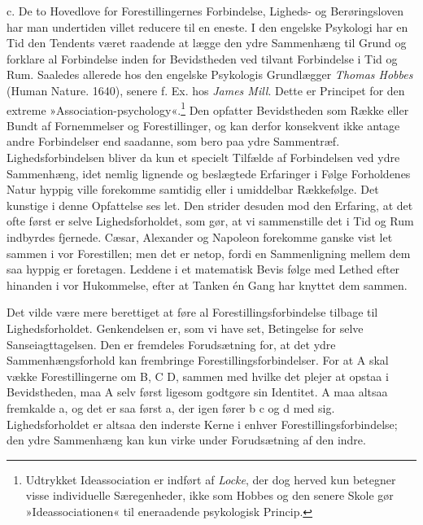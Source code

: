 \documentclass[12pt,a4paper,openany]{book}
\newcommand{\opage}[1]{\marginnote{\footnotesize\textit{[#1]}}}
\begin{document}
c. De to Hovedlove for Forestillingernes Forbindelse, Ligheds- og
Berøringsloven har man undertiden villet reducere til en eneste. I den
engelske Psykologi har en Tid den Tendents været raadende at lægge den
ydre Sammenhæng til Grund og forklare al Forbindelse inden for
Bevidstheden ved tilvant Forbindelse i Tid og Rum. Saaledes allerede hos
den engelske Psykologis Grundlægger \emph{Thomas Hobbes} (Human Nature.
1640), senere f. Ex. hos \emph{James Mill}. Dette er
\opage{192}Principet for den extreme
»Association-psychology«.\footnote[1]{Udtrykket Ideassociation er
indført af \emph{Locke}, der dog herved kun betegner visse individuelle
Særegenheder, ikke som Hobbes og den senere Skole gør »Ideassociationen«
til eneraadende psykologisk Princip.} Den opfatter Bevidstheden som
Række eller Bundt af Fornemmelser og Forestillinger, og kan derfor
konsekvent ikke antage andre Forbindelser end saadanne, som bero paa
ydre Sammentræf. Lighedsforbindelsen bliver da kun et specielt Tilfælde
af Forbindelsen ved ydre Sammenhæng, idet nemlig lignende og beslægtede
Erfaringer i Følge Forholdenes Natur hyppig ville forekomme samtidig
eller i umiddelbar Rækkefølge. Det kunstige i denne Opfattelse ses let.
Den strider desuden mod den Erfaring, at det ofte først er selve
Lighedsforholdet, som gør, at vi sammenstille det i Tid og Rum indbyrdes
fjernede. Cæsar, Alexander og Napoleon forekomme ganske vist let sammen
i vor Forestillen; men det er netop, fordi en Sammenligning mellem dem
saa hyppig er foretagen. Leddene i et matematisk Bevis følge med Lethed
efter hinanden i vor Hukommelse, efter at Tanken én Gang har knyttet dem
sammen.

Det vilde være mere berettiget at føre al Forestillingsforbindelse
tilbage til Lighedsforholdet. Genkendelsen er, som vi have set,
Betingelse for selve Sanseiagttagelsen. Den er fremdeles Forudsætning
for, at det ydre Sammenhængsforhold kan frembringe
Forestillingsforbindelser. For at A skal vække Forestillingerne om B, C
D, sammen med hvilke det plejer at opstaa i Bevidstheden, maa A selv
først ligesom godtgøre sin Identitet. A maa altsaa fremkalde a, og det
er saa først a, der igen fører b c og d med sig. Lighedsforholdet er
altsaa den inderste Kerne i enhver Forestillingsforbindelse; den ydre
Sammenhæng kan kun virke under Forudsætning af den indre.
\end{document}

